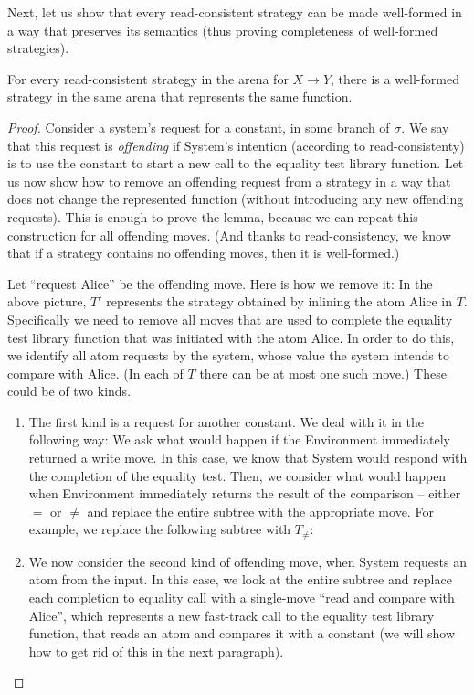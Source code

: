 Next, let us show that every read-consistent strategy can be made well-formed in a way that preserves its semantics
(thus proving completeness of well-formed strategies). 
\begin{lemma}\label{lem:all-well-formed}
    For every read-consistent strategy in the arena for $X \to Y$,
    there is a well-formed strategy in the same arena that represents the same function.
\end{lemma}
\begin{proof}
    Consider a system's request for a constant, in some branch of $\sigma$. 
    We say that this request is \emph{offending} if System's intention (according to read-consistenty) is to use
    the constant to start a new call to the equality test library function.
    Let us now show how to remove an offending request from a strategy in a way that does not change the represented function
    (without introducing any new offending requests). This is enough to prove the lemma,
    because we can repeat this construction for all offending moves. (And thanks to read-consistency, we know that 
    if a strategy contains no offending moves, then it is well-formed.)

    Let ``request Alice'' be the offending move. Here is how we remove it:
    In the above picture,  $T'$ represents  the strategy obtained by inlining the atom Alice in $T$. 
    Specifically we need to remove all moves that are used to complete the 
    equality test library function that was initiated with the atom Alice.
    In order to do this, we identify all atom requests by the system, 
    whose value the system intends to compare with Alice.
    (In each of $T$ there can be at most one such move.)
    These could be of two kinds.
    \begin{enumerate}
        \item 
    The first kind is a request for another 
    constant. We deal with it in the following way:
    We ask what would happen if the Environment immediately returned a write move. 
    In this case, we know that System would respond with the completion of the equality test. 
    Then, we consider what would happen  when Environment immediately returns the result of the comparison -- 
    either $=$ or $\neq$ and replace the entire subtree with the appropriate move. 
    For example, we replace the following subtree with $T_{\neq}$:
    \item We now consider the second kind of offending move, when System requests an atom from the input.
    In this case, we look at the entire subtree and replace each completion to equality call 
    with a single-move ``read and compare with Alice'', which represents a new fast-track 
    call to the equality test library function, that reads an atom and compares it with a constant
    (we will show how to get rid of this in the next paragraph).



\end{enumerate}
\end{proof}
